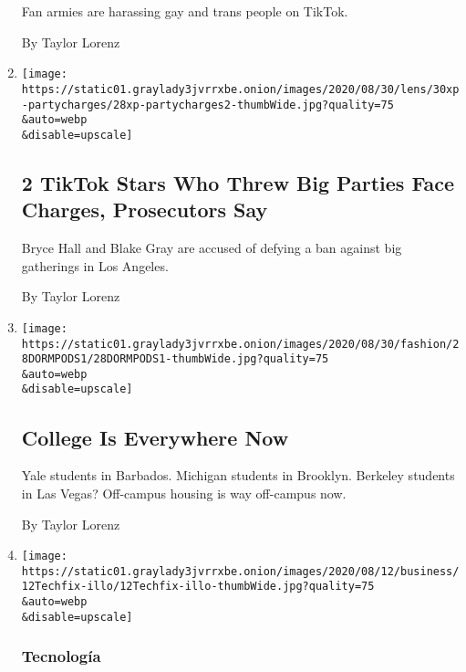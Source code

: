 \begin{enumerate}
  Fan armies are harassing gay and trans people on TikTok.

  By Taylor Lorenz
\item
  \href{/2020/08/28/style/2-tiktok-stars-who-threw-big-parties-face-charges-prosecutors-say.html}{}

  \texttt{[image: https://static01.graylady3jvrrxbe.onion/images/2020/08/30/lens/30xp-partycharges/28xp-partycharges2-thumbWide.jpg?quality=75\\\&auto=webp\\\&disable=upscale]}

  \hypertarget{2-tiktok-stars-who-threw-big-parties-face-charges-prosecutors-say}{%
  \subsection{2 TikTok Stars Who Threw Big Parties Face Charges,
  Prosecutors
  Say}\label{2-tiktok-stars-who-threw-big-parties-face-charges-prosecutors-say}}

  Bryce Hall and Blake Gray are accused of defying a ban against big
  gatherings in Los Angeles.

  By Taylor Lorenz
\item
  \href{/2020/08/28/style/college-collab-houses-coronavirus.html}{}

  \texttt{[image: https://static01.graylady3jvrrxbe.onion/images/2020/08/30/fashion/28DORMPODS1/28DORMPODS1-thumbWide.jpg?quality=75\\\&auto=webp\\\&disable=upscale]}

  \hypertarget{college-is-everywhere-now}{%
  \subsection{College Is Everywhere
  Now}\label{college-is-everywhere-now}}

  Yale students in Barbados. Michigan students in Brooklyn. Berkeley
  students in Las Vegas? Off-campus housing is way off-campus now.

  By Taylor Lorenz
\item
  \href{/es/2020/08/27/espanol/ciencia-y-tecnologia/instagram-reels-tik-tok.html}{}

  \texttt{[image: https://static01.graylady3jvrrxbe.onion/images/2020/08/12/business/12Techfix-illo/12Techfix-illo-thumbWide.jpg?quality=75\\\&auto=webp\\\&disable=upscale]}

  \hypertarget{tecnologuxeda}{%
  \subsubsection{Tecnología}\label{tecnologuxeda}}


\end{enumerate}
